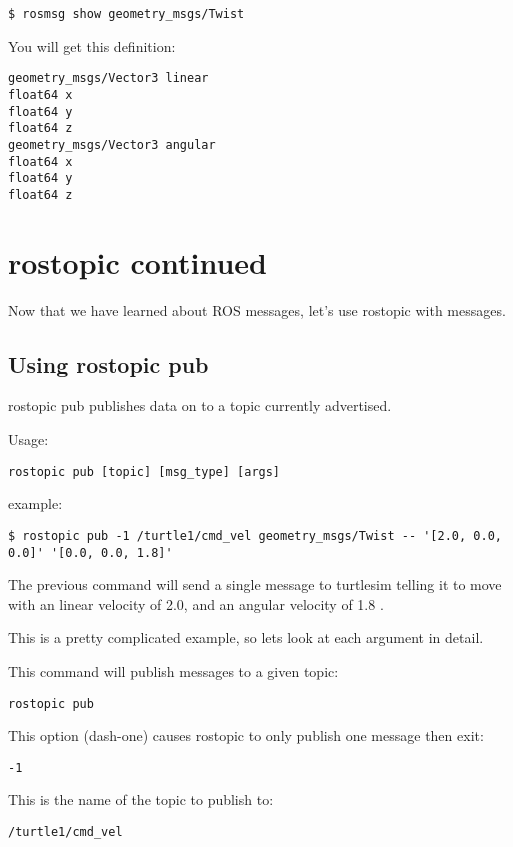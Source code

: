 \begin{lstlisting}[breaklines=true language=bash]
$ rosmsg show geometry_msgs/Twist
\end{lstlisting}

You will get this definition:

\begin{lstlisting}[breaklines=true language=bash]
geometry_msgs/Vector3 linear
float64 x
float64 y
float64 z
geometry_msgs/Vector3 angular
float64 x
float64 y
float64 z
\end{lstlisting}

\section{rostopic continued}
Now that we have learned about ROS messages, let's use rostopic with messages.

\subsection{Using rostopic pub}
rostopic pub publishes data on to a topic currently advertised.

Usage:
\begin{lstlisting}[breaklines=true languages=bash]
rostopic pub [topic] [msg_type] [args]
\end{lstlisting}

example:
\begin{lstlisting}[breaklines=true langauges=bash]
$ rostopic pub -1 /turtle1/cmd_vel geometry_msgs/Twist -- '[2.0, 0.0, 0.0]' '[0.0, 0.0, 1.8]'
\end{lstlisting}

The previous command will send a single message to turtlesim telling it to move with an linear velocity of 2.0, and an angular velocity of 1.8 .

This is a pretty complicated example, so lets look at each argument in detail.

This command will publish messages to a given topic:
\begin{lstlisting}[breaklines=true language=bash]
rostopic pub
\end{lstlisting}

This option (dash-one) causes rostopic to only publish one message then exit:
\begin{lstlisting}[breaklines=true language=bash]
-1
\end{lstlisting}

This is the name of the topic to publish to:
\begin{lstlisting}[breaklines=true language=bash]
/turtle1/cmd_vel
\end{lstlisting}

